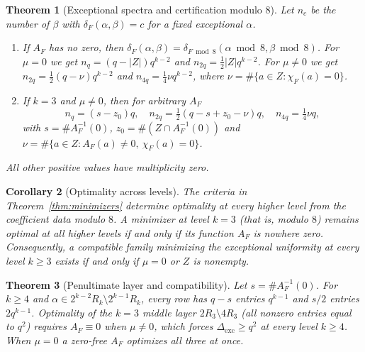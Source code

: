 \documentclass[11pt]{article}
\newtheorem{maintheorem}{Theorem}
\newtheorem{maincorollary}[maintheorem]{Corollary}
\theoremstyle{definition}
\theoremstyle{remark}
\newcommand{\Dexc}{\Delta_{\mathrm{exc}}}
\begin{document}
\begin{maintheorem}[Exceptional spectra and certification modulo $8$]\label{thm:spectrum}
Let $n_c$ be the number of $\beta$ with $\delta_F(\alpha,\beta)=c$ for a fixed exceptional $\alpha$.
\begin{enumerate}[label=(\arabic*)]
\item If $A_F$ has no zero, then $\delta_F(\alpha,\beta)=\delta_{F\bmod 8}(\alpha\bmod 8,\beta\bmod 8)$.
 For $\mu=0$ we get $n_q=(q-|Z|)q^{k-2}$ and $n_{2q}=\tfrac12|Z|q^{k-2}$.
 For $\mu\neq0$ we get $n_{2q}=\tfrac12(q-\nu)q^{k-2}$ and $n_{4q}=\tfrac14\nu q^{k-2}$,
 where $\nu=\#\{a\in Z:\chi_F(a)=0\}$.
\item If $k=3$ and $\mu\neq0$, then for arbitrary $A_F$
 \[ n_q=(s-z_0)q,\quad n_{2q}=\tfrac12(q-s+z_0-\nu)q,\quad n_{4q}=\tfrac14\nu q, \]
 with $s=\#A_F^{-1}(0)$, $z_0=\#(Z\cap A_F^{-1}(0))$ and $\nu=\#\{a\in Z: A_F(a)\neq0,\ \chi_F(a)=0\}$.
\end{enumerate}
All other positive values have multiplicity zero.
\end{maintheorem}

\begin{maincorollary}[Optimality across levels]\label{cor:crosslevel}
The criteria in Theorem~\ref{thm:minimizers} determine optimality at every higher level from the
coefficient data modulo $8$. A minimizer at level $k=3$ (that is, modulo $8$) remains optimal at all higher levels if and only if its
function $A_F$ is nowhere zero. Consequently, a compatible family minimizing the exceptional uniformity at
every level $k\ge3$ exists if and only if $\mu=0$ or $Z$ is nonempty.
\end{maincorollary}

\begin{maintheorem}[Penultimate layer and compatibility]\label{thm:layers}
Let $s=\#A_F^{-1}(0)$. For $k\ge4$ and $\alpha\in 2^{k-2}R_k\setminus 2^{k-1}R_k$, every row has $q-s$ entries $q^{k-1}$ and $s/2$
entries $2q^{k-1}$. Optimality of the $k=3$ middle layer $2R_3\setminus4R_3$ (all nonzero entries equal to $q^2$) requires $A_F\equiv0$ when $\mu\neq0$,
which forces $\Dexc\ge q^2$ at every level $k\ge4$.
When $\mu=0$ a zero-free $A_F$ optimizes all three at once.
\end{maintheorem}
\end{document}
